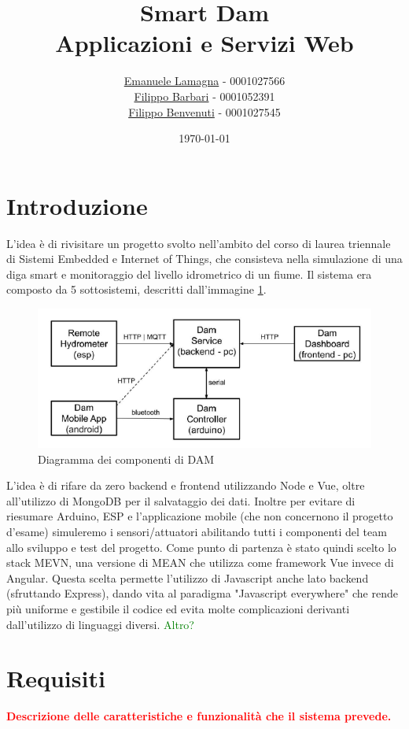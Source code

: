 \documentclass{article}
\title{
    Smart Dam \\
    \large Applicazioni e Servizi Web
}
\author{\href{mailto:emanuele.lamagna@studio.unibo.it}{Emanuele Lamagna} - 0001027566\\\href{mailto:filippo.barbari@studio.unibo.it}{Filippo Barbari} - 0001052391\\\href{mailto:filippo.benvenuti3@studio.unibo.it}{Filippo Benvenuti} - 0001027545}
\date{\today}
\begin{document}
\maketitle
\clearpage
\tableofcontents
\clearpage

\section*{Introduzione}\label{sec:intro}
L'idea è di rivisitare un progetto svolto nell'ambito del corso di laurea triennale di Sistemi Embedded e Internet of Things, che consisteva nella simulazione di una diga smart e monitoraggio del livello idrometrico di un fiume. Il sistema era composto da 5 sottosistemi, descritti dall'immagine \ref{fig:dam-scheme}.
\begin{figure}[h!]
	\centering
	\includegraphics[scale=0.7]{dam-scheme.png}
	\caption{Diagramma dei componenti di DAM}
	\label{fig:dam-scheme}
\end{figure}
L'idea è di rifare da zero backend e frontend utilizzando Node e Vue, oltre all'utilizzo di MongoDB per il salvataggio dei dati. Inoltre per evitare di riesumare Arduino, ESP e l'applicazione mobile (che non concernono il progetto d'esame) simuleremo i sensori/attuatori abilitando tutti i componenti del team allo sviluppo e test del progetto.
Come punto di partenza è stato quindi scelto lo stack MEVN, una versione di MEAN che utilizza come framework Vue invece di Angular. Questa scelta permette l'utilizzo di Javascript anche lato backend (sfruttando Express), dando vita al paradigma "Javascript everywhere" che rende più uniforme e gestibile il codice ed evita molte complicazioni derivanti dall'utilizzo di linguaggi diversi. 
\textcolor{green}{Altro?}
\clearpage

\section{Requisiti}
\textcolor{red}{\textbf{Descrizione delle caratteristiche e funzionalità che il sistema prevede.}} %
\end{document}
